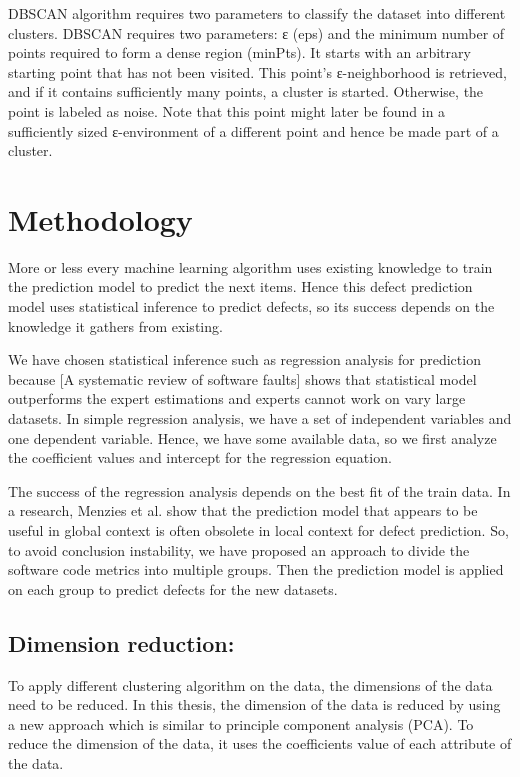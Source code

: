 \documentclass[12pt]{report}
\begin{document}
DBSCAN algorithm requires two parameters to classify the dataset into different clusters. DBSCAN requires two parameters: ε (eps) and the minimum number of points required to form a dense region (minPts). It starts with an arbitrary starting point that has not been visited. This point's ε-neighborhood is retrieved, and if it contains sufficiently many points, a cluster is started. Otherwise, the point is labeled as noise. Note that this point might later be found in a sufficiently sized ε-environment of a different point and hence be made part of a cluster.

\section{Methodology}
More or less every machine learning algorithm uses existing knowledge to train the prediction model to predict the next items. Hence this defect prediction model uses statistical inference to predict defects, so its success depends on the knowledge it gathers from existing. 

We have chosen statistical inference such as regression analysis for prediction because [A systematic review of software faults] shows that statistical model outperforms the expert estimations and experts cannot work on vary large datasets. In simple regression analysis, we have a set of independent variables and one dependent variable. Hence, we have some available data, so we first analyze the coefficient values and intercept for the regression equation.

The success of the regression analysis depends on the best fit of the train data. In a research, Menzies et al. show that the prediction model that appears to be useful in global context is often obsolete in local context for defect prediction. So, to avoid conclusion instability, we have proposed an approach to divide the software code metrics into multiple groups. Then the prediction model is applied on each group to predict defects for the new datasets.  

\subsection{Dimension reduction:} 
To apply different clustering algorithm on the data, the dimensions of the data need to be reduced. In this thesis, the dimension of the data is reduced by using a new approach which is similar to principle component analysis (PCA). To reduce the dimension of the data, it uses the coefficients value of each attribute of the data. 
\end{document}
